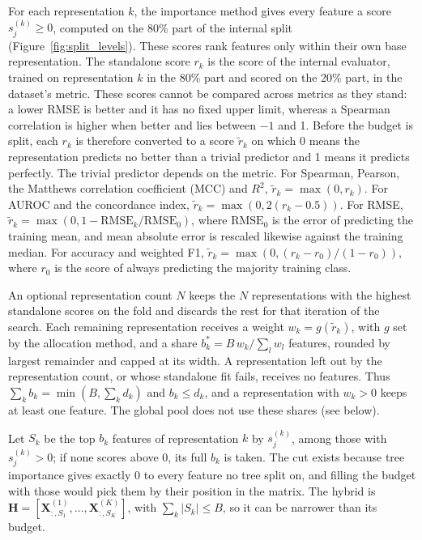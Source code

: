 For each representation $k$, the importance method gives every feature a score $s^{(k)}_j \ge 0$, computed on the 80\% part of the internal split (Figure~\ref{fig:split_levels}). These scores rank features only within their own base representation. The standalone score $r_k$ is the score of the internal evaluator, trained on representation $k$ in the 80\% part and scored on the 20\% part, in the dataset's metric. These scores cannot be compared across metrics as they stand: a lower RMSE is better and it has no fixed upper limit, whereas a Spearman correlation is higher when better and lies between $-1$ and 1. Before the budget is split, each $r_k$ is therefore converted to a score $\tilde r_k$ on which 0 means the representation predicts no better than a trivial predictor and 1 means it predicts perfectly. The trivial predictor depends on the metric. For Spearman, Pearson, the Matthews correlation coefficient (MCC) and $R^2$, $\tilde r_k = \max(0, r_k)$. For AUROC and the concordance index, $\tilde r_k = \max(0, 2(r_k - 0.5))$. For RMSE, $\tilde r_k = \max(0, 1 - \mathrm{RMSE}_k/\mathrm{RMSE}_0)$, where $\mathrm{RMSE}_0$ is the error of predicting the training mean, and mean absolute error is rescaled likewise against the training median. For accuracy and weighted F1, $\tilde r_k = \max(0, (r_k - r_0)/(1 - r_0))$, where $r_0$ is the score of always predicting the majority training class.

An optional representation count $N$ keeps the $N$ representations with the highest standalone scores on the fold and discards the rest for that iteration of the search. Each remaining representation receives a weight $w_k = g(\tilde r_k)$, with $g$ set by the allocation method, and a share $b^*_k = B\, w_k / \sum_l w_l$ features, rounded by largest remainder and capped at its width. A representation left out by the representation count, or whose standalone fit fails, receives no features. Thus $\sum_k b_k = \min(B, \sum_k d_k)$ and $b_k \le d_k$, and a representation with $w_k > 0$ keeps at least one feature. The global pool does not use these shares (see below).

Let $S_k$ be the top $b_k$ features of representation $k$ by $s^{(k)}_j$, among those with $s^{(k)}_j > 0$; if none scores above 0, its full $b_k$ is taken. The cut exists because tree importance gives exactly 0 to every feature no tree split on, and filling the budget with those would pick them by their position in the matrix. The hybrid is $\mathbf{H} = [\mathbf{X}^{(1)}_{:,S_1}, \dots, \mathbf{X}^{(K)}_{:,S_K}]$, with $\sum_k |S_k| \le B$, so it can be narrower than its budget.

